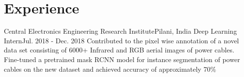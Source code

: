 \section{Experience}
  \resumeSubHeadingListStart
  
    \resumeSubheading
      {Central Electronics Engineering Research Institute}{Pilani, India}
      {Deep Learning Intern}{Jul. 2018 - Dec. 2018}
      \resumeItemListStart
          {Contributed to the pixel wise annotation of a novel data set consisting of 6000+ Infrared and RGB aerial images of power cables.}
          {Fine-tuned a pretrained mask RCNN model for instance segmentation of power cables on the new dataset and achieved accuracy of approximately 70\%}
      \resumeItemListEnd

  \resumeSubHeadingListEnd
